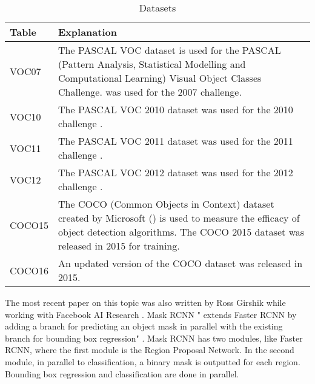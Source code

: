 \begin{table}[h]
\centering
\caption{Datasets}
\label{datasets}
\begin{tabular}{|p{1.65cm}|p{10.5cm}|}
\hline
\textbf{Table} & \textbf{Explanation}                                                                                                                                                                                               \\ \hline
VOC07          & The PASCAL VOC dataset is used for the PASCAL (Pattern Analysis, Statistical Modelling and Computational Learning) Visual Object Classes Challenge. \parencite{pascal-voc-2007} was used for the 2007 challenge. \\ \hline
VOC10          & The PASCAL VOC 2010 dataset was used for the 2010 challenge \parencite{pascal-voc-2010}.                                                                                                                         \\ \hline
VOC11          & The PASCAL VOC 2011 dataset was used for the 2011 challenge \parencite{pascal-voc-2011}.                                                                                                                        \\ \hline
VOC12          & The PASCAL VOC 2012 dataset was used for the 2012 challenge \parencite{pascal-voc-2012}.                                                                                                                        \\ \hline
COCO15         & The COCO (Common Objects in Context) dataset created by Microsoft (\parencite{coco}) is used to measure the efficacy of object detection algorithms. The COCO 2015 dataset was released in 2015 for training.    \\ \hline
COCO16         & An updated version of the COCO dataset was released in 2015.                                                                                                                                                       \\ \hline
\end{tabular}
\end{table}

The most recent paper on this topic was also written by Ross Girshik while
working with Facebook AI Research \parencite{maskRcnn}. Mask RCNN " extends Faster
RCNN by adding a branch for predicting an object mask in parallel with the
existing branch for bounding box regression" \parencite{maskRcnn}.
Mask RCNN has two modules, like Faster RCNN, where the first module is the
Region Proposal Network. In the second module, in parallel to classification, a
binary mask is outputted for each region. Bounding box regression and
classification are done in parallel.

